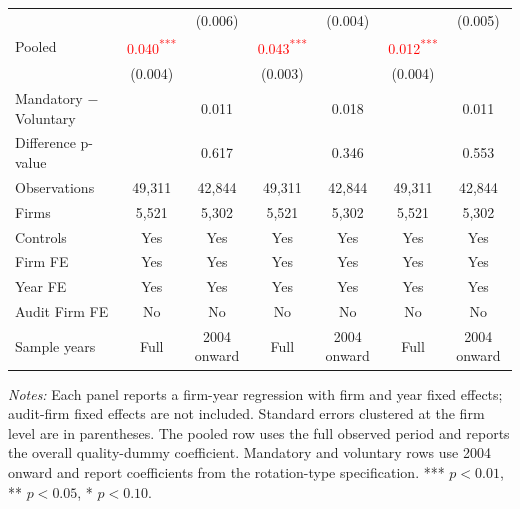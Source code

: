\documentclass[10pt]{article}
\newcommand{\sym}[1]{\textsuperscript{#1}}
\begin{document}
\begin{minipage}{19cm}
\begin{threeparttable}
\begin{tabular}{l cc cc cc}
 &  & (0.006) &  & (0.004) &  & (0.005) \\
Pooled & \textcolor{red}{0.040\sym{***}} &  & \textcolor{red}{0.043\sym{***}} &  & \textcolor{red}{0.012\sym{***}} &  \\
 & (0.004) &  & (0.003) &  & (0.004) &  \\
Mandatory $-$ Voluntary &  & 0.011 &  & 0.018 &  & 0.011 \\
Difference p-value &  & 0.617 &  & 0.346 &  & 0.553 \\
Observations & 49,311 & 42,844 & 49,311 & 42,844 & 49,311 & 42,844 \\
Firms & 5,521 & 5,302 & 5,521 & 5,302 & 5,521 & 5,302 \\
\midrule
Controls & Yes & Yes & Yes & Yes & Yes & Yes \\
Firm FE & Yes & Yes & Yes & Yes & Yes & Yes \\
Year FE & Yes & Yes & Yes & Yes & Yes & Yes \\
Audit Firm FE & No & No & No & No & No & No \\
Sample years & Full & 2004 onward & Full & 2004 onward & Full & 2004 onward \\
\bottomrule
\end{tabular}
\begin{tablenotes}\fontsize{9}{11}\selectfont
\item \fontsize{9}{11}\selectfont \textit{Notes:} Each panel reports a firm-year regression with firm and year fixed effects; audit-firm fixed effects are not included. Standard errors clustered at the firm level are in parentheses. The pooled row uses the full observed period and reports the overall quality-dummy coefficient. Mandatory and voluntary rows use 2004 onward and report coefficients from the rotation-type specification. *** \(p<0.01\), ** \(p<0.05\), * \(p<0.10\).
\end{tablenotes}
\end{threeparttable}

\end{minipage}
\end{document}
